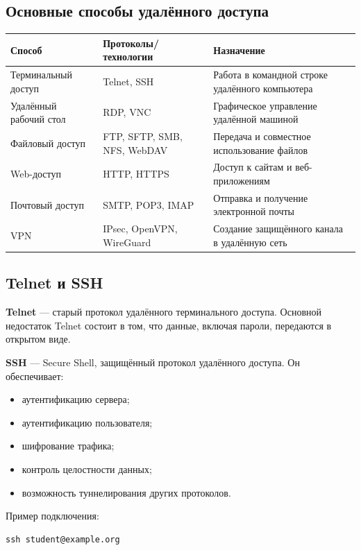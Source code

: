 \documentclass[12pt,a4paper]{article}
\begin{document}
\subsection{Основные способы удалённого доступа}

\begin{center}
\begin{tabular}{|p{3cm}|p{4cm}|p{6cm}|}
\hline
Способ & Протоколы/технологии & Назначение \\
\hline
Терминальный доступ & Telnet, SSH & Работа в командной строке удалённого компьютера \\
\hline
Удалённый рабочий стол & RDP, VNC & Графическое управление удалённой машиной \\
\hline
Файловый доступ & FTP, SFTP, SMB, NFS, WebDAV & Передача и совместное использование файлов \\
\hline
Web-доступ & HTTP, HTTPS & Доступ к сайтам и веб-приложениям \\
\hline
Почтовый доступ & SMTP, POP3, IMAP & Отправка и получение электронной почты \\
\hline
VPN & IPsec, OpenVPN, WireGuard & Создание защищённого канала в удалённую сеть \\
\hline
\end{tabular}
\end{center}

\subsection{Telnet и SSH}

\textbf{Telnet} --- старый протокол удалённого терминального доступа. Основной недостаток Telnet состоит в том, что данные, включая пароли, передаются в открытом виде.

\textbf{SSH} --- Secure Shell, защищённый протокол удалённого доступа. Он обеспечивает:
\begin{itemize}
    \item аутентификацию сервера;
    \item аутентификацию пользователя;
    \item шифрование трафика;
    \item контроль целостности данных;
    \item возможность туннелирования других протоколов.
\end{itemize}

Пример подключения:
\begin{lstlisting}
ssh student@example.org
\end{lstlisting}
\end{document}
